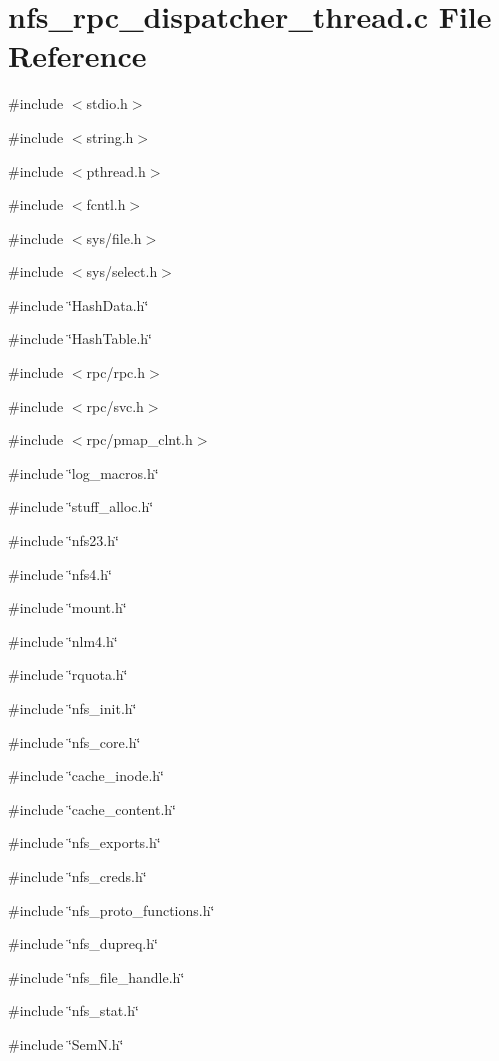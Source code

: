 \section{nfs\_\-rpc\_\-dispatcher\_\-thread.c File Reference}
\label{nfs__rpc__dispatcher__thread_8c}
{\ttfamily \#include $<$stdio.h$>$}\par
{\ttfamily \#include $<$string.h$>$}\par
{\ttfamily \#include $<$pthread.h$>$}\par
{\ttfamily \#include $<$fcntl.h$>$}\par
{\ttfamily \#include $<$sys/file.h$>$}\par
{\ttfamily \#include $<$sys/select.h$>$}\par
{\ttfamily \#include \char`\"{}HashData.h\char`\"{}}\par
{\ttfamily \#include \char`\"{}HashTable.h\char`\"{}}\par
{\ttfamily \#include $<$rpc/rpc.h$>$}\par
{\ttfamily \#include $<$rpc/svc.h$>$}\par
{\ttfamily \#include $<$rpc/pmap\_\-clnt.h$>$}\par
{\ttfamily \#include \char`\"{}log\_\-macros.h\char`\"{}}\par
{\ttfamily \#include \char`\"{}stuff\_\-alloc.h\char`\"{}}\par
{\ttfamily \#include \char`\"{}nfs23.h\char`\"{}}\par
{\ttfamily \#include \char`\"{}nfs4.h\char`\"{}}\par
{\ttfamily \#include \char`\"{}mount.h\char`\"{}}\par
{\ttfamily \#include \char`\"{}nlm4.h\char`\"{}}\par
{\ttfamily \#include \char`\"{}rquota.h\char`\"{}}\par
{\ttfamily \#include \char`\"{}nfs\_\-init.h\char`\"{}}\par
{\ttfamily \#include \char`\"{}nfs\_\-core.h\char`\"{}}\par
{\ttfamily \#include \char`\"{}cache\_\-inode.h\char`\"{}}\par
{\ttfamily \#include \char`\"{}cache\_\-content.h\char`\"{}}\par
{\ttfamily \#include \char`\"{}nfs\_\-exports.h\char`\"{}}\par
{\ttfamily \#include \char`\"{}nfs\_\-creds.h\char`\"{}}\par
{\ttfamily \#include \char`\"{}nfs\_\-proto\_\-functions.h\char`\"{}}\par
{\ttfamily \#include \char`\"{}nfs\_\-dupreq.h\char`\"{}}\par
{\ttfamily \#include \char`\"{}nfs\_\-file\_\-handle.h\char`\"{}}\par
{\ttfamily \#include \char`\"{}nfs\_\-stat.h\char`\"{}}\par
{\ttfamily \#include \char`\"{}SemN.h\char`\"{}}\par
